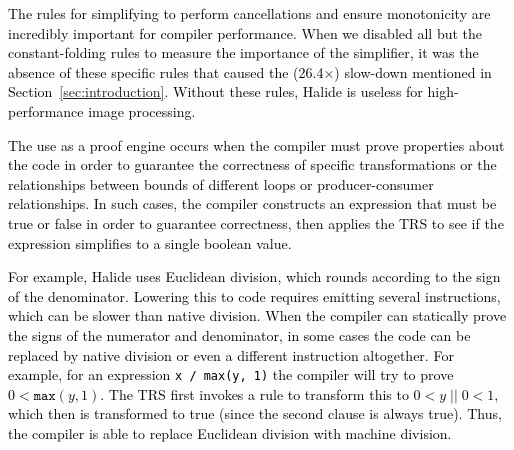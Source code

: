 \documentclass[acmsmall]{acmart}\settopmatter{}
\newcommand{\modified}[1]{\textcolor{black}{{#1}}}
\newcommand{\hmax}[0]{\texttt{max}}
\newcommand{\hmin}[0]{\texttt{min}}
\begin{document}
\modified{The rules for simplifying to perform cancellations and
  ensure monotonicity are incredibly important for compiler
  performance. When we disabled all but the constant-folding rules to
  measure the importance of the simplifier, it was the absence of
  these specific rules that caused the (26.4$\times$) slow-down
  mentioned in Section~\ref{sec:introduction}. Without these rules,
  Halide is useless for high-performance image
  processing.}


\modified{The use as a proof engine occurs when the compiler must prove properties about the code in order to guarantee the
  correctness of specific transformations or the relationships between bounds of
  different loops or producer-consumer relationships.  In such cases, the compiler constructs
  an expression that must be true or false in order to guarantee correctness, then applies
  the TRS to see if the expression simplifies to a single boolean value.}

\modified{For example, Halide uses Euclidean division, which rounds according to the sign of the
  denominator.  Lowering this to code requires emitting several instructions, which can be
  slower than native division.  When the compiler can statically prove the signs of the numerator
  and denominator, in some cases the code can be replaced by native division or even a different
  instruction altogether.  For example, for an expression \texttt{x / max(y, 1)} the compiler
  will try to prove $0 < \hmax(y, 1)$.  The TRS first invokes a rule to transform this to
  $0 < y\; ||\; 0 < 1$, which then is transformed to true (since the second clause is always true).
  Thus, the compiler is able to replace Euclidean division with machine division.}
\end{document}
